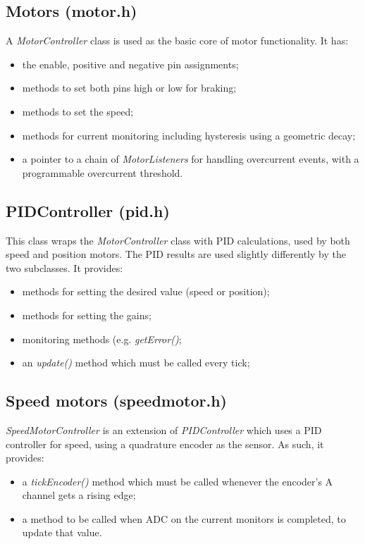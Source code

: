 \subsection{Motors (motor.h)}
A \emph{MotorController} class is used as the basic core of motor functionality. It has:
\begin{itemize}
\item the enable, positive and negative pin assignments;
\item methods to set both pins high or low for braking;
\item methods to set the speed;
\item methods for current monitoring including hysteresis using a geometric decay;
\item a pointer to a chain of \emph{MotorListeners} for handling overcurrent events, with
a programmable overcurrent threshold.
\end{itemize}

\subsection{PIDController (pid.h)}
This class wraps the \emph{MotorController} class with PID calculations,
used by both speed and position motors. The PID results
are used slightly differently by the two subclasses.
It provides:
\begin{itemize}
\item methods for setting the desired value (speed or position);
\item methods for setting the gains;
\item monitoring methods (e.g. \emph{getError()};
\item an \emph{update()} method which must be called every tick;
\end{itemize}


\subsection{Speed motors (speedmotor.h)}
\emph{SpeedMotorController} is an extension of \emph{PIDController} which
uses a PID controller for speed, using a quadrature encoder as the sensor. As such,
it provides:
\begin{itemize}
\item a \emph{tickEncoder()} method which must be called whenever the encoder's A channel gets a rising edge;
\item a method to be called when ADC on the current monitors is completed, to update that value.
\end{itemize}

